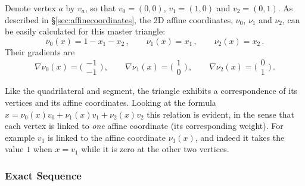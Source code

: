 Denote vertex $a$ by $v_a$, so that $v_0=(0,0)$, $v_1=(1,0)$ and $v_2=(0,1)$.
As described in \S\ref{sec:affinecoordinates}, the 2D affine coordinates, $\nu_0$, $\nu_1$ and $\nu_2$, can be easily calculated for this master triangle:
\begin{equation}
	\nu_0(x)=1-x_1-x_2\,,\qquad
	\nu_1(x)=x_1\,,\qquad
	\nu_2(x)=x_2\,.
\end{equation}
Their gradients are
\begin{equation}
\nabla\nu_0(x)=\Big(\begin{smallmatrix}-1\\[2pt]-1\end{smallmatrix}\Big)\,,\qquad
\nabla\nu_1(x)=\Big(\begin{smallmatrix}1\\[2pt]0\end{smallmatrix}\Big)\,,\qquad
\nabla\nu_2(x)=\Big(\begin{smallmatrix}0\\[2pt]1\end{smallmatrix}\Big)\,.
\end{equation}

Like the quadrilateral and segment, the triangle exhibits a correspondence of its vertices and its affine coordinates.
Looking at the formula $x=\nu_0(x)v_0+\nu_1(x)v_1+\nu_2(x)v_2$ this relation is evident, in the sense that each vertex is linked to \textit{one} affine coordinate (its corresponding weight).
For example $v_1$ is linked to the affine coordinate $\nu_1(x)$, and indeed it takes the value $1$ when $x=v_1$ while it is zero at the other two vertices.

\subsubsection*{Exact Sequence}



